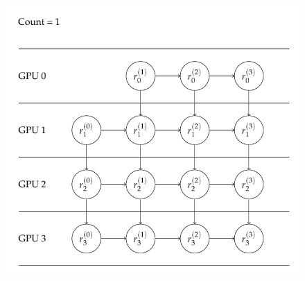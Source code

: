 \documentclass[11pt]{beamer}
\begin{document}
\begin{frame}
{\begin{figure}[h]
			\includegraphics[scale=0.7]{images/orders/count/count1.pdf}
			\label{fig:01}
		\end{figure}
	}
\end{frame}
\end{document}
